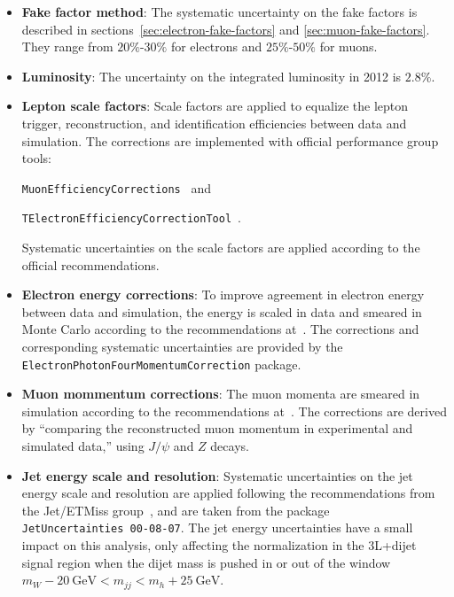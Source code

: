 \begin{itemize}
	\item \textbf{Fake factor method}: The systematic uncertainty on the fake factors is described in sections~\ref{sec:electron-fake-factors} and \ref{sec:muon-fake-factors}. They range from $20\%$-$30\%$ for electrons and $25\%$-$50\%$ for muons. 

	\item \textbf{Luminosity}: The uncertainty on the integrated luminosity in 2012 is $2.8\%$. 

	\item \textbf{Lepton scale factors}: Scale factors are applied to equalize the lepton trigger, reconstruction, and identification efficiencies between data and simulation. The corrections are implemented with official performance group tools: 

	\texttt{MuonEfficiencyCorrections}~\cite{MuonEfficiencyScaleFactors} and 

	\texttt{TElectronEfficiencyCorrectionTool}~\cite{ElectronEfficiencyScaleFactors}. 

	Systematic uncertainties on the scale factors are applied according to the official recommendations. 

	\item \textbf{Electron energy corrections}: To improve agreement in electron energy between data and simulation, the energy is scaled in data and smeared in Monte Carlo according to the recommendations at~\cite{ElectronEnergyCorrectionsGEO20,ElectronEnergyCorrectionsGEO21}. The corrections and corresponding systematic uncertainties are provided by the \texttt{ElectronPhotonFourMomentumCorrection} package. 

	\item \textbf{Muon mommentum corrections}: The muon momenta are smeared in simulation according to the recommendations at~\cite{MuonMomentumCorrections}. The corrections are derived by ``comparing the reconstructed muon momentum in experimental and simulated data,'' using $J/\psi$ and $Z$ decays. 

	\item \textbf{Jet energy scale and resolution}: Systematic uncertainties on the jet energy scale and resolution are applied following the recommendations from the Jet/ETMiss group~\cite{JetEtmissRecommendations2012}, and are taken from the package \texttt{JetUncertainties~00-08-07}. The jet energy uncertainties have a small impact on this analysis, only affecting the normalization in the 3L+dijet signal region when the dijet mass is pushed in or out of the window $m_{W}-20~\mbox{GeV}<m_{jj}<m_{h}+25~\mbox{GeV}$. 
\end{itemize}

